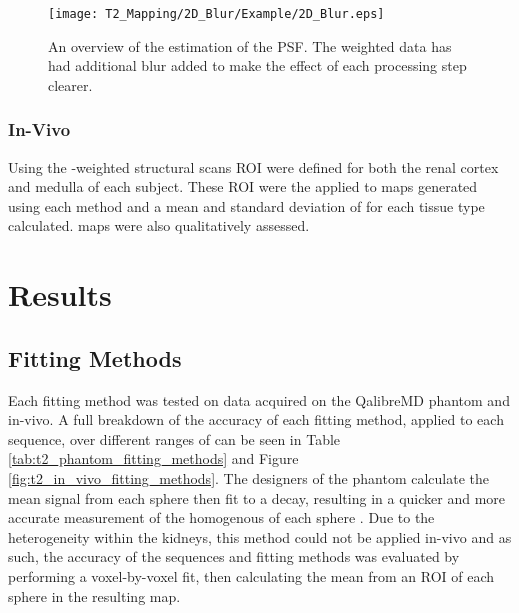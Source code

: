 \begin{figure}[H]
	\centering
	\texttt{[image: T2\_Mapping/2D\_Blur/Example/2D\_Blur.eps]}
	\caption{An overview of the estimation of the \ac{PSF}. The \ttwo weighted data has had additional blur added to make the effect of each processing step clearer.}
	\label{fig:t2_2d_blur}	
\end{figure}

\subsubsection{In-Vivo}

Using the \tone-weighted structural scans \ac{ROI} were defined for both the renal cortex and medulla of each subject. These \ac{ROI} were the applied to \ttwo maps generated using each method and a mean and standard deviation of \ttwo for each tissue type calculated. \ttwo maps were also qualitatively assessed.

\section{Results}

\subsection{Fitting Methods}

Each fitting method was tested on data acquired on the QalibreMD phantom and in-vivo. A full breakdown of the accuracy of each fitting method, applied to each sequence, over different ranges of \ttwo can be seen in Table \ref{tab:t2_phantom_fitting_methods} and Figure \ref{fig:t2_in_vivo_fitting_methods}. The designers of the phantom calculate the mean signal from each sphere then fit to a \ttwo decay, resulting in a quicker and more accurate measurement of the homogenous \ttwo of each sphere \cite{mristandards_mristandardsphantomviewer_2020}. Due to the heterogeneity within the kidneys, this method could not be applied in-vivo and as such, the accuracy of the sequences and fitting methods was evaluated by performing a voxel-by-voxel fit, then calculating the mean \ttwo from an \ac{ROI} of each sphere in the resulting map.

